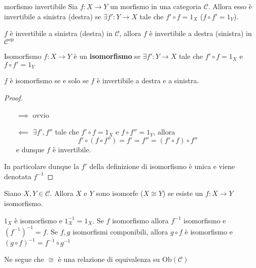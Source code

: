 \begin{definition}{morfismo invertibile}
    Sia \(f : X\to Y\) un morfismo in una categoria \(\mathcal{C}\). Allora esso è
    invertibile a sinistra (destra) se \(\exists  f' : Y \to X\) tale che
    \(f' \circ f = 1_X\) (\(f \circ f' = 1_Y\)).
\end{definition}
\begin{remark}{}
    \(f\) è invertibile a sinistra (destra) in \(\mathcal{C}\), allora \(f\) è invertibile
    a destra (sinistra) in \(\mathcal{C}^{op}\) 
\end{remark}

\begin{definition}{Isomorfismo}
    \(f : X \to Y\) è un \textbf{isomorfismo} se \(\exists f' : Y \to X\) tale che \(f'
    \circ f = 1_X\) e \(f \circ f' = 1_Y\) 
\end{definition}
\begin{remark}{}
    \(f\) è isomorfismo se e solo se \(f\) è invertibile a destra e a sinistra. 
\end{remark}
\begin{proof}\( \)
\begin{itemize}
    \item[\(\implies \)] ovvio
    \item[\(\impliedby \)] \(\exists f', f''\) tale che \(f' \circ f = 1_X\)  e
        \(f \circ f'' = 1_Y\), allora
        \[
          f' \circ {( f \circ f'')} = f' = f'' = {(f' \circ f)} \circ f''
        \]
        e dunque \(f\) è invertibile.
\end{itemize}
    In particolare dunque la \(f'\) della definizione di isomorfismo è unica e
    viene denotata \(f^{-1}\) 
\end{proof}

\begin{definition}{}
    Siano \(X, Y \in \mathcal{C}\). Allora \(X\) e \(Y\) sono isomorfe (\(X \cong Y\)) se
    esiste un \(f: X \to Y\) isomorfismo.
\end{definition}

\begin{remark}{}
    \(1_X\) è isomorfismo e \(1_X^{-1} = 1_X\). Se \(f\) isomorfismo
    allora \(f^{-1}\) isomorfismo e \({(f^{-1})}^{-1} = f\). Se \(f, g\)
    isomorfismi componibili, allora \(g \circ f\) è isomorfismo e \({(g \circ f)}^{-1} = f^{-1} \circ g^{-1}\) 

    Ne segue che \(\cong\) è una relazione di equivalenza su \(\mathrm{Ob}{(\mathcal{C})}\) 
\end{remark}

